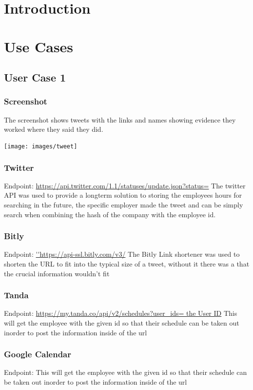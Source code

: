 \documentclass[12pt]{article}
\begin{document}
\section{Introduction}


\section{ Use Cases }



\subsection{User Case 1}

\subsubsection{Screenshot}
The screenshot shows tweets with the links and names showing evidence they worked where they said they did.

\texttt{[image: images/tweet]}\\[.1cm]

\subsubsection{Twitter}
Endpoint: \url{https://api.twitter.com/1.1/statuses/update.json?status=}
The twitter API was used to provide a longterm solution to storing the employees hours for searching in the future,
the specific employer made the tweet and can be simply search when combining the hash of the company with the employee id.

\subsubsection{Bitly}
Endpoint: \url{''https://api-ssl.bitly.com/v3/}
The Bitly Link shortener was used to shorten the URL to fit into the typical size of a tweet, without it there was a
that the crucial information wouldn't fit

\subsubsection{Tanda}
Endpoint: \url{https://my.tanda.co/api/v2/schedules?user_ids= the User ID}
This will get the employee with the given id so that their schedule can be taken out inorder to post the information inside
of the url

\subsubsection{Google Calendar}
Endpoint:
This will get the employee with the given id so that their schedule can be taken out inorder to post the information inside
of the url
\end{document}
